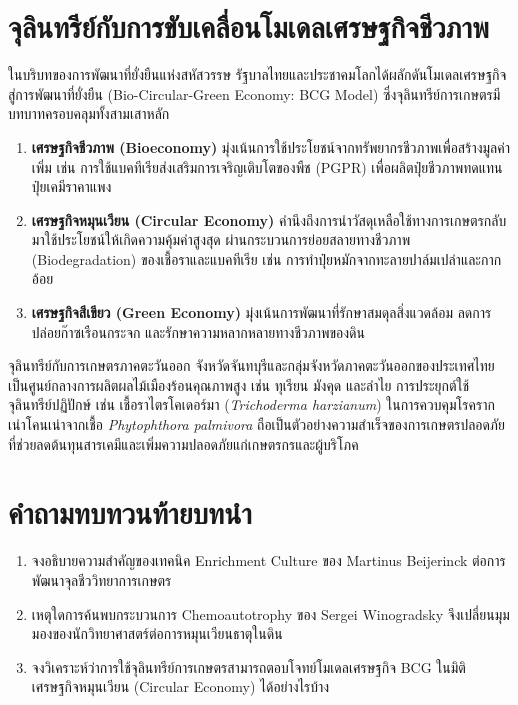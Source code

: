 \section{จุลินทรีย์กับการขับเคลื่อนโมเดลเศรษฐกิจชีวภาพ}

ในบริบทของการพัฒนาที่ยั่งยืนแห่งสหัสวรรษ รัฐบาลไทยและประชาคมโลกได้ผลักดันโมเดลเศรษฐกิจสู่การพัฒนาที่ยั่งยืน (Bio-Circular-Green Economy: BCG Model) ซึ่งจุลินทรีย์การเกษตรมีบทบาทครอบคลุมทั้งสามเสาหลัก
\begin{enumerate}
    \item \textbf{เศรษฐกิจชีวภาพ (Bioeconomy)} มุ่งเน้นการใช้ประโยชน์จากทรัพยากรชีวภาพเพื่อสร้างมูลค่าเพิ่ม เช่น การใช้แบคทีเรียส่งเสริมการเจริญเติบโตของพืช (PGPR) เพื่อผลิตปุ๋ยชีวภาพทดแทนปุ๋ยเคมีราคาแพง
    \item \textbf{เศรษฐกิจหมุนเวียน (Circular Economy)} คำนึงถึงการนำวัสดุเหลือใช้ทางการเกษตรกลับมาใช้ประโยชน์ให้เกิดความคุ้มค่าสูงสุด ผ่านกระบวนการย่อยสลายทางชีวภาพ (Biodegradation) ของเชื้อราและแบคทีเรีย เช่น การทำปุ๋ยหมักจากทะลายปาล์มเปล่าและกากอ้อย
    \item \textbf{เศรษฐกิจสีเขียว (Green Economy)} มุ่งเน้นการพัฒนาที่รักษาสมดุลสิ่งแวดล้อม ลดการปล่อยก๊าซเรือนกระจก และรักษาความหลากหลายทางชีวภาพของดิน
\end{enumerate}

\begin{agribox}{จุลินทรีย์กับการเกษตรภาคตะวันออก}
จังหวัดจันทบุรีและกลุ่มจังหวัดภาคตะวันออกของประเทศไทย เป็นศูนย์กลางการผลิตผลไม้เมืองร้อนคุณภาพสูง เช่น ทุเรียน มังคุด และลำไย การประยุกต์ใช้จุลินทรีย์ปฏิปักษ์ เช่น เชื้อราไตรโคเดอร์มา (\textit{Trichoderma harzianum}) ในการควบคุมโรครากเน่าโคนเน่าจากเชื้อ \textit{Phytophthora palmivora} ถือเป็นตัวอย่างความสำเร็จของการเกษตรปลอดภัยที่ช่วยลดต้นทุนสารเคมีและเพิ่มความปลอดภัยแก่เกษตรกรและผู้บริโภค
\end{agribox}

\section*{คำถามทบทวนท้ายบทนำ}
\begin{enumerate}
    \item จงอธิบายความสำคัญของเทคนิค Enrichment Culture ของ Martinus Beijerinck ต่อการพัฒนาจุลชีววิทยาการเกษตร
    \item เหตุใดการค้นพบกระบวนการ Chemoautotrophy ของ Sergei Winogradsky จึงเปลี่ยนมุมมองของนักวิทยาศาสตร์ต่อการหมุนเวียนธาตุในดิน
    \item จงวิเคราะห์ว่าการใช้จุลินทรีย์การเกษตรสามารถตอบโจทย์โมเดลเศรษฐกิจ BCG ในมิติเศรษฐกิจหมุนเวียน (Circular Economy) ได้อย่างไรบ้าง
\end{enumerate}

\clearpage
